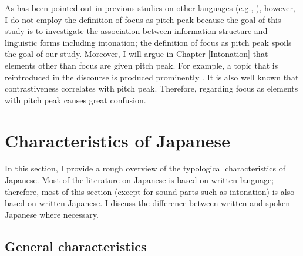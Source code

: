 As has been pointed out in previous studies on other languages (e.g., ),
however,
I do not employ the definition of focus as pitch peak
because the goal of this study is to investigate the association between information structure and linguistic forms including intonation;
the definition of focus as pitch peak spoils the goal of our study.
Moreover,
I will argue in Chapter \ref{Intonation} that 
elements other than focus are given pitch peak.
For example, a topic that is reintroduced in the discourse is produced prominently \cite[see also][]{gundel99}.
It is also well known that
contrastiveness correlates with pitch peak.
Therefore, regarding focus as elements with pitch peak causes great confusion.






\section{Characteristics of Japanese}\label{BackSecCharJap}

In this section, I provide a rough overview of the typological characteristics of Japanese.
Most of the literature on Japanese is based on written language;
therefore, most of this section (except for sound parts such as intonation) is also based on written Japanese.
I discuss the difference between written and spoken Japanese
where necessary.


\subsection{General characteristics}\label{BackSubSecGeneralChar}

